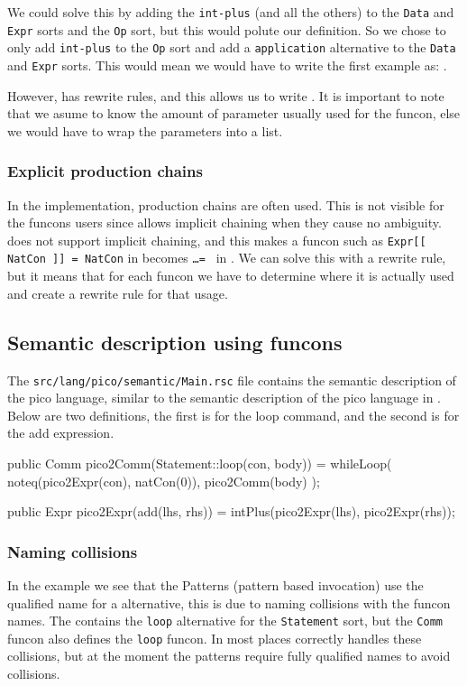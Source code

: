 \documentclass[a4paper, oneside, notitlepage]{article}
\newcommand{\ASFSDF}{\textsmaller{ASF\hspace{-.05em}\raisebox{.4ex}{\tiny\bf +}SDF}\xspace}
\newcommand{\ASF}{\textsmaller{ASF}\xspace}
\newcommand{\AST}{\textsmaller{AST}\xspace}
\newcommand{\ADT}{\textsmaller{ADT}\xspace}
\newcommand{\filename}[1]{\texttt{#1}\xspace}
\newcommand{\code}[1]{\texttt{#1}\xspace}
\begin{document}
		We could solve this by adding the \code{int-plus} (and all the others)
		to the \code{Data} and \code{Expr} sorts and the \code{Op} sort, but this would
		polute our \ADT definition.
		So we chose to only add \code{int-plus} to the \code{Op} sort and add a
		\code{application} alternative to the \code{Data} and \code{Expr} sorts.
		This would mean we would have to write the first example as:
		.

		However, \Rascal has rewrite rules, and this allows us to write 
		.
		It is important to note that we asume to know the amount of parameter
		usually used for the funcon, else we would have to wrap the parameters
		into a list.

		\subsubsection{Explicit production chains}
		In the \ASFSDF implementation, production chains are often used.
		This is not visible for the funcons users since \ASFSDF allows implicit
		chaining when they cause no ambiguity.
		\Rascal does not support implicit chaining, and this makes a funcon such
		as \code{Expr[[ NatCon ]] = NatCon} in \ASF becomes
		\code{\ldots = } in \Rascal.
		We can solve this with a rewrite rule, but it means that for each funcon
		we have to determine where it is actually used and create a rewrite rule
		for that usage.
	
	\subsection{Semantic description using funcons}

		The \filename{src/lang/pico/semantic/Main.rsc} file contains the semantic
		description of the pico language, similar to the semantic description of
		the pico language in \ASFSDF.
		Below are two definitions, the first is for the loop command, and the
		second is for the add expression.

\begin{rascal}
public Comm pico2Comm(Statement::loop(con, body)) =
	whileLoop( 
		noteq(pico2Expr(con), natCon(0)), 
		pico2Comm(body)
	);

public Expr pico2Expr(add(lhs, rhs)) = intPlus(pico2Expr(lhs), pico2Expr(rhs));
\end{rascal}

		\subsubsection{Naming collisions}
		In the example we see that the Patterns (pattern based invocation) use
		the qualified name for a alternative, this is due to naming collisions
		with the funcon names.
		The \AST contains the \code{loop} alternative for the \code{Statement}
		sort, but the \code{Comm} funcon also defines the \code{loop} funcon.
		In most places \Rascal correctly handles these collisions, but at the
		moment the patterns require fully qualified names to avoid collisions.
\end{document}
